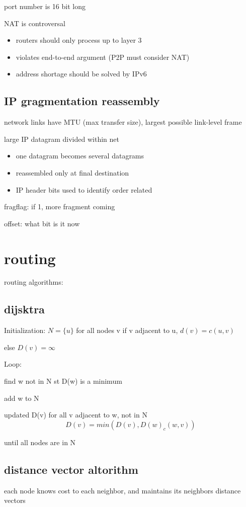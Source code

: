 \documentclass[10pt]{article}
\theoremstyle{break}
\begin{document}
port number is 16 bit long 

NAT is controversal 
\begin{itemize}
    \item routers should only process up to layer 3 
    \item violates end-to-end argument (P2P must consider NAT)
    \item address shortage should be solved by IPv6
\end{itemize}

\subsection{IP gragmentation reassembly}
network links have MTU (max transfer size), largest possible link-level frame 

large IP datagram divided within net

\begin{itemize}
    \item  one datagram becomes several datagrams 
    \item reassembled only at final destination 
    \item IP header bits used to identify order related
\end{itemize}

fragflag: if 1, more fragment coming 

offset: what bit is it now

\section{routing}
routing algorithms:
\subsection{dijsktra}
Initialization: 
$N = \{u\}$
for all nodes v
if v adjacent to u, $d(v)=c(u,v)$

else $D(v)=\infty$

Loop:

find w not in N st D(w) is a minimum 

add w to N 

updated D(v) for all v adjacent to w, not in N 
$$D(v)=min(D(v), D(w)_c(w,v))$$

until all nodes are in N

\subsection{distance vector altorithm}
each node knows cost to each neighbor, and maintains its neighbors distance vectors 
\end{document}
